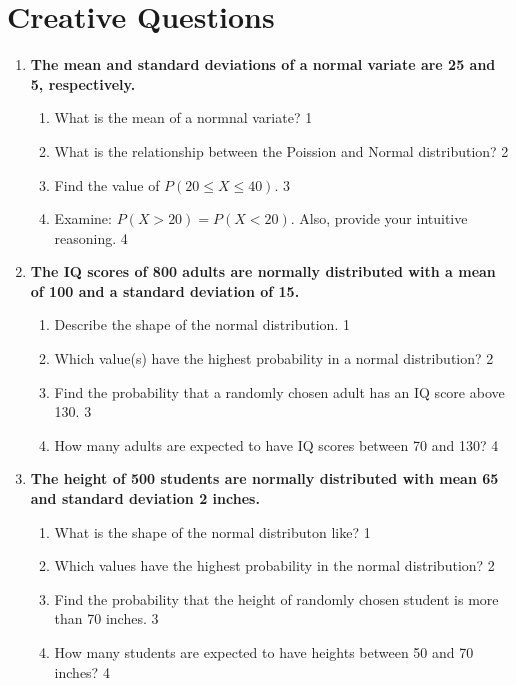 \documentclass[a4paper,oneside]{book}
\begin{document}
\section{Creative Questions}
  \begin{enumerate}
 \item
  \textbf{The mean and standard deviations of a normal variate are 25 and 5, respectively. }
  
  \begin{enumerate}
    \item
	What is the mean of  a normnal variate? \hfill 1
    \item
	What is the relationship between the Poission and Normal distribution? \hfill 2
    \item  
	Find the value of $P(20 \le X \le 40).$ \hfill 3
    \item
	Examine: $P(X>20) = P(X<20)$. Also, provide your intuitive reasoning. \hfill 4
 \end{enumerate}
 
\item
\textbf{The IQ scores of 800 adults are normally distributed with a mean of 100 and a standard deviation of 15.}

\begin{enumerate}
    \item
    Describe the shape of the normal distribution. \hfill 1
    \item
    Which value(s) have the highest probability in a normal distribution? \hfill 2
    \item  
    Find the probability that a randomly chosen adult has an IQ score above 130. \hfill 3
    \item
    How many adults are expected to have IQ scores between 70 and 130? \hfill 4
\end{enumerate} 
 
 \item
  \textbf{The height of 500 students are normally distributed with mean 65 and standard deviation 2 inches. }

  \begin{enumerate}
    \item
	What is the shape of the normal distributon like? \hfill 1
    \item
	Which values have the highest probability in the normal distribution? \hfill 2
    \item  
	Find the probability that the height of randomly chosen student is more than 70 inches. \hfill 3
    \item
	How many students are expected to have heights between 50 and 70 inches? \hfill 4
  \end{enumerate}	
	  \end{enumerate}
\end{document}
